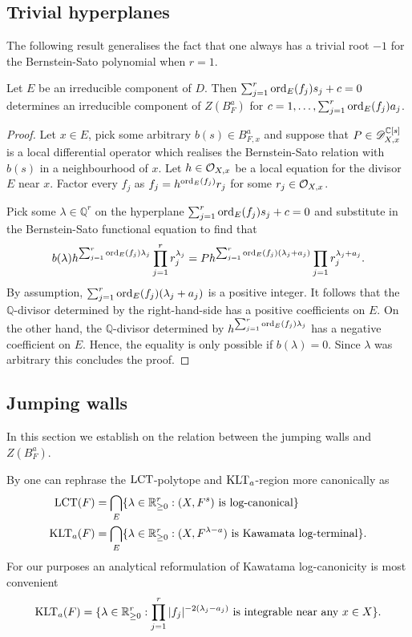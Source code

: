 \subsection{Trivial hyperplanes}
The following result generalises the fact that one always has a trivial root $-1$ for the  Bernstein-Sato polynomial when $r=1$.
\begin{proposition}
  Let $E$ be an irreducible component of $D$.
  Then $\sum_{j=1}^r \operatorname{ord}_{E}(f_j)s_j + c = 0$ determines an irreducible component of $Z(B_F^a)$ for $c = 1,\ldots, \sum_{j=1}^{r}\operatorname{ord}_{E}(f_j)a_j$.
\end{proposition}
\begin{proof}
  Let $x\in E$, pick some arbitrary $b(s)\in B_{F,x}^a$ and suppose that $P\in \mathscr{D}_{X,x}^{\mathbb{C}[s]}$ is a local differential operator which realises the Bernstein-Sato relation with $b(s)$ in a neighbourhood of $x$.
  Let $h \in \mathcal{O}_{X,x}$ be a local equation for the divisor $E$ near $x$.
  Factor every $f_j$ as $f_j = h^{\operatorname{ord}_E(f_j)} r_j$ for some $r_j\in \mathcal{O}_{X,x}$.

  Pick some $\lambda\in \mathbb{Q}^r$ on the hyperplane $\sum_{j=1}^r \operatorname{ord}_{E}(f_j)s_j + c = 0$ and substitute in the Bernstein-Sato functional equation to find that
  $$b(\lambda)h^{\sum_{j=1}^r \operatorname{ord}_{E}(f_j) \lambda_j} \prod_{j=1}^r r_{j}^{\lambda_j} = P h^{\sum_{j=1}^r \operatorname{ord}_E(f_j)(\lambda_j + a_j)} \prod_{j=1}r_j^{\lambda_j + a_j}.$$
  By assumption, $\sum_{j=1}^r \operatorname{ord}_E(f_j)(\lambda_j + a_j)$ is a positive integer.
  It follows that the $\mathbb{Q}$-divisor determined by the right-hand-side has a positive coefficients on $E$.
  On the other hand, the $\mathbb{Q}$-divisor determined by $h^{\sum_{j=1}^r \operatorname{ord}_{E}(f_j) \lambda_j}$ has a negative coefficient on $E$.
  Hence, the equality is only possible if $b(\lambda)=0$.
  Since $\lambda$ was arbitrary this concludes the proof.
\end{proof}
\subsection{Jumping walls}\label{sec: JumpingWall}
In this section we establish  on the relation between the jumping walls and $Z(B_F^a).$

By \cite[Corollary 3.12]{kollar1997singularities} one can rephrase the $\operatorname{LCT}$-polytope and $\operatorname{KLT}_a$-region more canonically as
\begin{align*}
    \operatorname{LCT}(F) &=  \bigcap_{E}\{\lambda\in \mathbb{R}_{\geq 0}^r : (X,F^s) \text{ is log-canonical}\}\\
    \operatorname{KLT}_{a}(F)&= \bigcap_{E}\{\lambda\in \mathbb{R}_{\geq 0}^r: (X,F^{\lambda - a}) \text{ is Kawamata log-terminal}\}.
\end{align*}
For our purposes an analytical reformulation of Kawatama log-canonicity \cite[Proposition 3.20]{kollar1997singularities} is most convenient
$$\operatorname{KLT}_a(F) = \{\lambda\in \mathbb{R}_{\geq 0}^r : \prod_{j=1}^r \vert f_j \vert^{-2(\lambda_j-a_j)}\text{ is integrable near any }x\in X\}.$$

